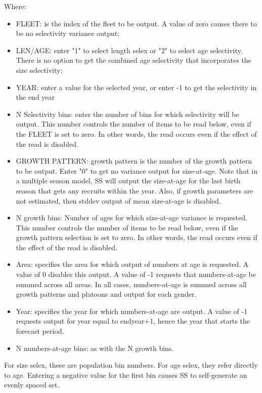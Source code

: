 Where:
\begin{itemize}
	\item FLEET:  is the index of the fleet to be output.  A value of zero causes there to be no selectivity variance output;
	\item LEN/AGE:  enter "1" to select length selex or "2" to select age selectivity.  There is no option to get the combined age selectivity that incorporates the size selectivity;
	\item YEAR:  enter a value for the selected year, or enter -1 to get the selectivity in the end year
	\item 	N Selectivity bins:  enter the number of bins for which selectivity will be output.  This number controls the number of items to be read below, even if the FLEET is set to zero.  In other words, the read occurs even if the effect of the read is disabled.
	\item GROWTH PATTERN:  growth pattern is the number of the growth pattern to be output.  Enter "0" to get no variance output for size-at-age.   Note that in a multiple season model, SS will output the size-at-age for the last birth season that gets any recruits within the year.  Also, if growth parameters are not estimated, then stddev output of mean size-at-age is disabled.
	\item 	N growth bins:  Number of ages for which size-at-age variance is requested.  This number controls the number of items to be read below, even if the growth pattern selection is set to zero.   In other words, the read occurs even if the effect of the read is disabled.
	\item 	Area:  specifies the area for which output of numbers at age is requested.  A value of 0 disables this output.  A value of -1 requests that numbers-at-age be summed across all areas.  In all cases, numbers-at-age is summed across all growth patterns and platoons and output for each gender.
	\item 	Year:  specifies the year for which numbers-at-age are output.  A value of -1 requests output for year equal to endyear+1, hence the year that starts the forecast period.
	\item N numbers-at-age bins:  as with the N growth bins.
\end{itemize}
For size selex, these are population bin numbers.  For age selex, they refer directly to age.  Entering a negative value for the first bin causes SS to self-generate an evenly spaced set.

